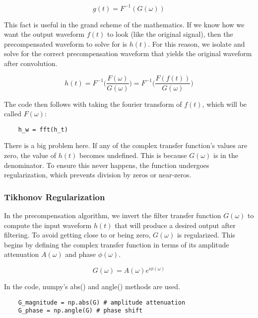 \begin{equation}
    g(t) = F^{-1}(G(\omega))
\end{equation}

This fact is useful in the grand scheme of the mathematics. If we know how we want the output waveform $f(t)$ to look (like the original signal), then the precompensated waveform to solve for is $h(t)$. For this reason, we isolate and solve for the correct precompensation waveform that yields the original waveform after convolution.

\begin{equation}
    h(t) = F^{-1}\biggr(\frac{F(\omega)}{G(\omega)}\biggr) = F^{-1} \biggr(\frac{F(f(t))}{G(\omega)}\biggr)
\end{equation}

The code then follows with taking the fourier transform of $f(t)$, which will be called $F(\omega)$:

\begin{verbatim}
    h_w = fft(h_t)
\end{verbatim}

There is a big problem here. If any of the complex transfer function's values are zero, the value of $h(t)$ becomes undefined. This is because $G(\omega)$ is in the denominator. To ensure this never happens, the function undergoes regularization, which prevents division by zeros or near-zeros.

\subsubsection{Tikhonov Regularization}

In the precompensation algorithm, we invert the filter transfer function $G(\omega)$ to compute the input waveform $h(t)$ that will produce a desired output after filtering. To avoid getting close to or being zero, $G(\omega)$ is regularized. This begins by defining the complex transfer function in terms of its amplitude attenuation $A(\omega)$ and phase $\phi(\omega)$.

\begin{equation}
    G(\omega) = A(\omega)e^{i \phi(\omega)}
\end{equation}

In the code, numpy's abs() and angle() methods are used.

\begin{verbatim}
    G_magnitude = np.abs(G) # amplitude attenuation
    G_phase = np.angle(G) # phase shift
\end{verbatim}

